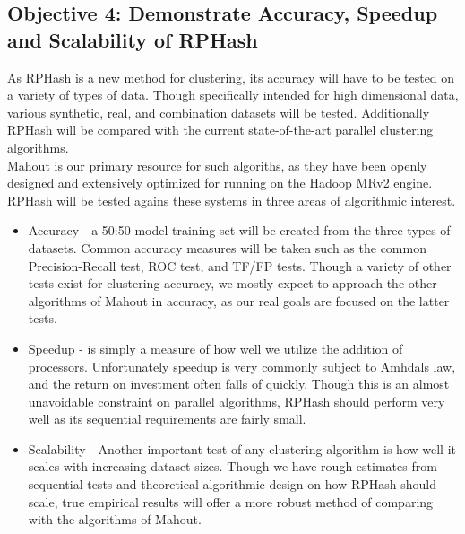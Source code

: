 \documentclass[a4paper,10pt]{article}
\begin{document}
\subsection{Objective 4: Demonstrate Accuracy, Speedup and Scalability of RPHash}
As RPHash is a new method for clustering, its accuracy will have to be tested on
a variety of types of data. Though specifically intended for high dimensional
data, various synthetic, real, and combination datasets will be tested. Additionally
RPHash will be compared with the current state-of-the-art parallel clustering
algorithms.\\
Mahout is our primary resource for such algoriths, as they have been openly designed
and extensively optimized for running on the Hadoop MRv2 engine. RPHash will be
tested agains these systems in three areas of algorithmic interest.
\begin{itemize}
 \item Accuracy - a 50:50 model training set will be created from the three types of
 datasets. Common accuracy measures will be taken such as the common Precision-Recall
 test, ROC test, and TF/FP tests. Though a variety of other tests exist for clustering
 accuracy, we mostly expect to approach the other algorithms of Mahout in accuracy, as
 our real goals are focused on the latter tests.
 \item Speedup - is simply a measure of how well we utilize the addition of processors. Unfortunately
 speedup is very commonly subject to Amhdals law, and the return on investment often falls of quickly.
 Though this is an almost unavoidable constraint on parallel algorithms, RPHash should perform very well
 as its sequential requirements are fairly small.
 \item Scalability - Another important test of any clustering algorithm is how well it scales
 with increasing dataset sizes. Though we have rough estimates from sequential tests and theoretical
 algorithmic design on how RPHash should scale, true empirical results will offer a more robust
 method of comparing with the algorithms of Mahout.
\end{itemize}
\end{document}
